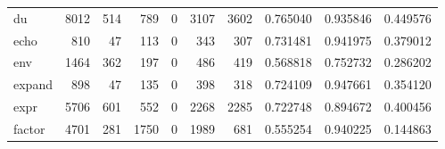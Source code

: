 \begin{tabular}{lrrrrrrrrr}
du        &                                8012 &                                             514 &                                            789 &                                             0 &                                           3107 &                                         3602 &                                           0.765040 &                               0.935846 &                             0.449576 \\
echo      &                                 810 &                                              47 &                                            113 &                                             0 &                                            343 &                                          307 &                                           0.731481 &                               0.941975 &                             0.379012 \\
env       &                                1464 &                                             362 &                                            197 &                                             0 &                                            486 &                                          419 &                                           0.568818 &                               0.752732 &                             0.286202 \\
expand    &                                 898 &                                              47 &                                            135 &                                             0 &                                            398 &                                          318 &                                           0.724109 &                               0.947661 &                             0.354120 \\
expr      &                                5706 &                                             601 &                                            552 &                                             0 &                                           2268 &                                         2285 &                                           0.722748 &                               0.894672 &                             0.400456 \\
factor    &                                4701 &                                             281 &                                           1750 &                                             0 &                                           1989 &                                          681 &                                           0.555254 &                               0.940225 &                             0.144863 \\

\end{tabular}
